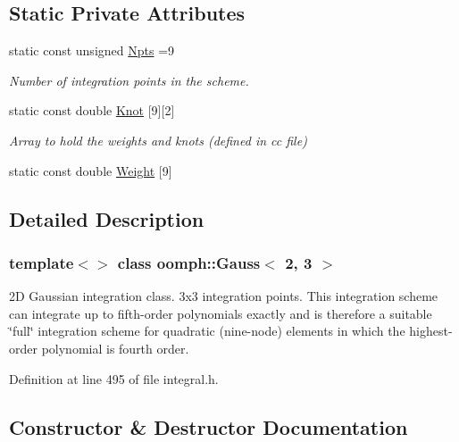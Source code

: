\subsection*{Static Private Attributes}
\begin{DoxyCompactItemize}
\item 
static const unsigned \hyperlink{classoomph_1_1Gauss_3_012_00_013_01_4_a3bf464fda1f207de75b487283cb9ffbb}{Npts} =9
\begin{DoxyCompactList}\small\item\em Number of integration points in the scheme. \end{DoxyCompactList}\item 
static const double \hyperlink{classoomph_1_1Gauss_3_012_00_013_01_4_ac6dccf63e4d699385004202956ebea97}{Knot} \mbox{[}9\mbox{]}\mbox{[}2\mbox{]}
\begin{DoxyCompactList}\small\item\em Array to hold the weights and knots (defined in cc file) \end{DoxyCompactList}\item 
static const double \hyperlink{classoomph_1_1Gauss_3_012_00_013_01_4_a9f6a4915292200bd62d4a84b3aec82b1}{Weight} \mbox{[}9\mbox{]}
\end{DoxyCompactItemize}


\subsection{Detailed Description}
\subsubsection*{template$<$$>$\newline
class oomph\+::\+Gauss$<$ 2, 3 $>$}

2D Gaussian integration class. 3x3 integration points. This integration scheme can integrate up to fifth-\/order polynomials exactly and is therefore a suitable \char`\"{}full\char`\"{} integration scheme for quadratic (nine-\/node) elements in which the highest-\/order polynomial is fourth order. 

Definition at line 495 of file integral.\+h.



\subsection{Constructor \& Destructor Documentation}
\mbox{\label{classoomph_1_1Gauss_3_012_00_013_01_4_aff567b5ac7cfbc7a6ea0caf495c6f0d5}} 
